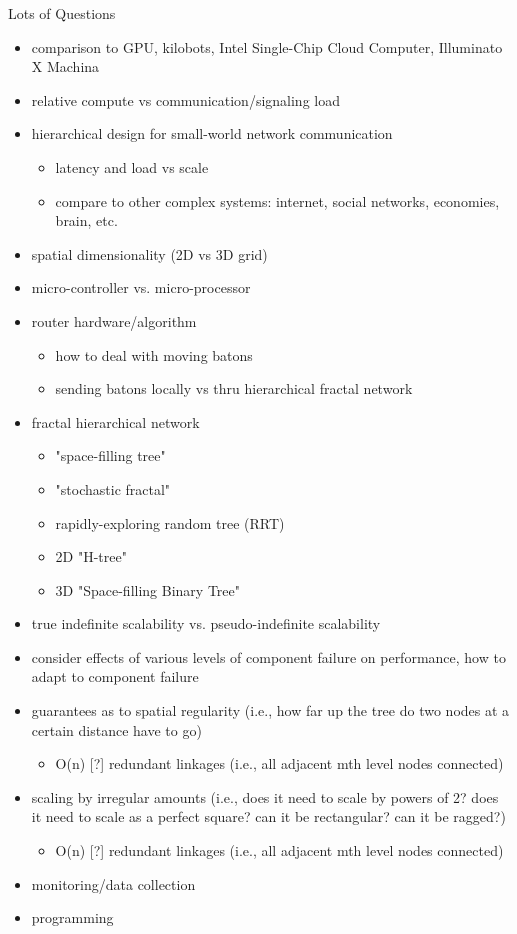 \begin{frame}[allowframebreaks=0.8,t]{Lots of Questions}
\begin{itemize}
\item comparison to GPU, kilobots, Intel Single-Chip Cloud Computer, Illuminato X Machina
\item relative compute vs communication/signaling load
\item hierarchical design for small-world network communication
  \begin{itemize}
  \item latency and load vs scale
  \item compare to other complex systems: internet, social networks, economies, brain, etc.
  \end{itemize}
\item spatial dimensionality (2D vs 3D grid)
\item micro-controller vs. micro-processor
\item router hardware/algorithm
  \begin{itemize}
  \item how to deal with moving batons
  \item sending batons locally vs thru hierarchical fractal network
  \end{itemize}
\item fractal hierarchical network
  \begin{itemize}
  \item "space-filling tree"
  \item "stochastic fractal"
  \item rapidly-exploring random tree (RRT)
  \item 2D "H-tree"
  \item 3D "Space-filling Binary Tree"
  \end{itemize}
\item true indefinite scalability vs. pseudo-indefinite scalability
\item consider effects of various levels of component failure on performance, how to adapt to component failure
\item guarantees as to spatial regularity (i.e., how far up the tree do two nodes at a certain distance have to go)
  \begin{itemize}
  \item O(n) [?] redundant linkages (i.e., all adjacent mth level nodes connected)
  \end{itemize}
\item scaling by irregular amounts (i.e., does it need to scale by powers of 2? does it need to scale as a perfect square? can it be rectangular? can it be ragged?)
  \begin{itemize}
  \item O(n) [?] redundant linkages (i.e., all adjacent mth level nodes connected)
\end{itemize}
\item monitoring/data collection
\item programming
\end{itemize}

\end{frame}
